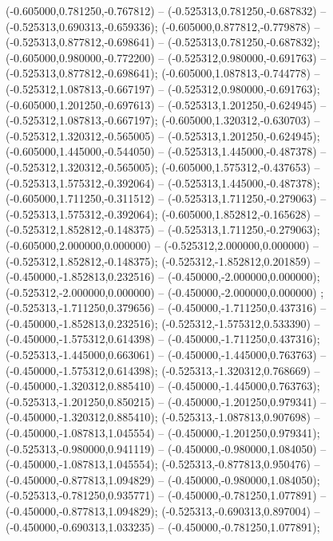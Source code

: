  (-0.605000,0.781250,-0.767812) -- (-0.525313,0.781250,-0.687832) -- (-0.525313,0.690313,-0.659336);
 (-0.605000,0.877812,-0.779878) -- (-0.525313,0.877812,-0.698641) -- (-0.525313,0.781250,-0.687832);
 (-0.605000,0.980000,-0.772200) -- (-0.525312,0.980000,-0.691763) -- (-0.525313,0.877812,-0.698641);
 (-0.605000,1.087813,-0.744778) -- (-0.525312,1.087813,-0.667197) -- (-0.525312,0.980000,-0.691763);
 (-0.605000,1.201250,-0.697613) -- (-0.525313,1.201250,-0.624945) -- (-0.525312,1.087813,-0.667197);
 (-0.605000,1.320312,-0.630703) -- (-0.525312,1.320312,-0.565005) -- (-0.525313,1.201250,-0.624945);
 (-0.605000,1.445000,-0.544050) -- (-0.525313,1.445000,-0.487378) -- (-0.525312,1.320312,-0.565005);
 (-0.605000,1.575312,-0.437653) -- (-0.525313,1.575312,-0.392064) -- (-0.525313,1.445000,-0.487378);
 (-0.605000,1.711250,-0.311512) -- (-0.525313,1.711250,-0.279063) -- (-0.525313,1.575312,-0.392064);
 (-0.605000,1.852812,-0.165628) -- (-0.525312,1.852812,-0.148375) -- (-0.525313,1.711250,-0.279063);
 (-0.605000,2.000000,0.000000) -- (-0.525312,2.000000,0.000000) -- (-0.525312,1.852812,-0.148375);
 (-0.525312,-1.852812,0.201859) -- (-0.450000,-1.852813,0.232516) -- (-0.450000,-2.000000,0.000000);
 (-0.525312,-2.000000,0.000000) -- (-0.450000,-2.000000,0.000000) ;
 (-0.525313,-1.711250,0.379656) -- (-0.450000,-1.711250,0.437316) -- (-0.450000,-1.852813,0.232516);
 (-0.525312,-1.575312,0.533390) -- (-0.450000,-1.575312,0.614398) -- (-0.450000,-1.711250,0.437316);
 (-0.525313,-1.445000,0.663061) -- (-0.450000,-1.445000,0.763763) -- (-0.450000,-1.575312,0.614398);
 (-0.525313,-1.320312,0.768669) -- (-0.450000,-1.320312,0.885410) -- (-0.450000,-1.445000,0.763763);
 (-0.525313,-1.201250,0.850215) -- (-0.450000,-1.201250,0.979341) -- (-0.450000,-1.320312,0.885410);
 (-0.525313,-1.087813,0.907698) -- (-0.450000,-1.087813,1.045554) -- (-0.450000,-1.201250,0.979341);
 (-0.525313,-0.980000,0.941119) -- (-0.450000,-0.980000,1.084050) -- (-0.450000,-1.087813,1.045554);
 (-0.525313,-0.877813,0.950476) -- (-0.450000,-0.877813,1.094829) -- (-0.450000,-0.980000,1.084050);
 (-0.525313,-0.781250,0.935771) -- (-0.450000,-0.781250,1.077891) -- (-0.450000,-0.877813,1.094829);
 (-0.525313,-0.690313,0.897004) -- (-0.450000,-0.690313,1.033235) -- (-0.450000,-0.781250,1.077891);
